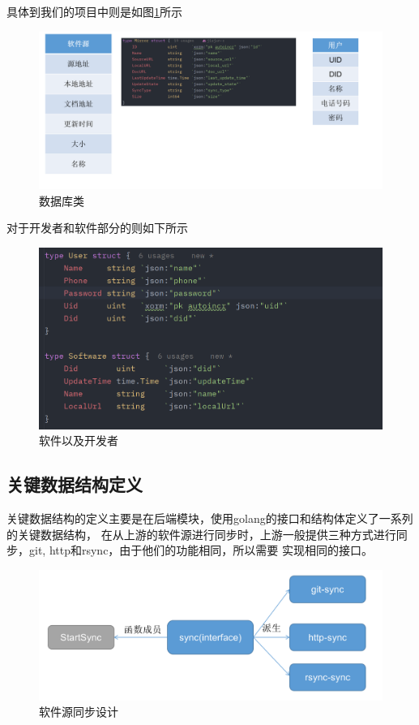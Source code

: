 \documentclass[supercite]{Experimental_Report}
\theoremstyle{definition}
\begin{document}
具体到我们的项目中则是如图\ref{xdatabase}所示
\begin{figure}[!h]
    \centering
    \includegraphics[width=1.0\textwidth]{./images/xorm.png}
    \caption{数据库类}
    \label{xdatabase}
\end{figure}
\newpage
对于开发者和软件部分的则如下所示
\begin{figure}[!h]
    \centering
    \includegraphics[width=1.0\textwidth]{./images/dev.png}
    \caption{软件以及开发者}
    \label{Software}
\end{figure}


\subsection{关键数据结构定义}
关键数据结构的定义主要是在后端模块，使用golang的接口和结构体定义了一系列的关键数据结构，
在从上游的软件源进行同步时，上游一般提供三种方式进行同步，git, http和rsync，由于他们的功能相同，所以需要
实现相同的接口。
\begin{figure}[!h]
    \centering
    \includegraphics[width=1.0\textwidth]{./images/sync.png}
    \caption{软件源同步设计}
    \label{sync}
\end{figure}
\end{document}
